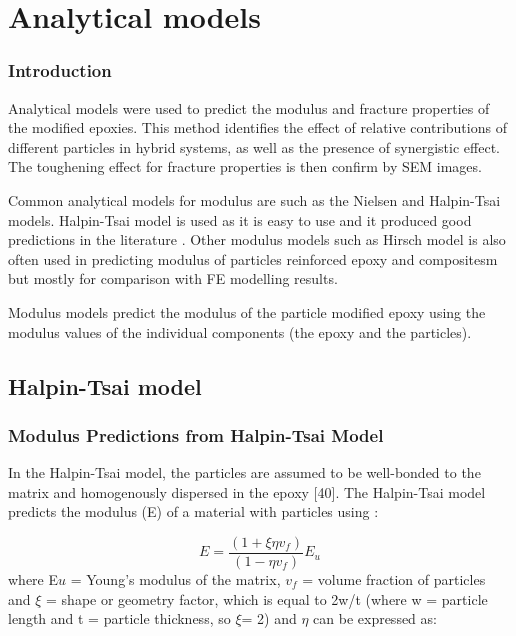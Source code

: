 \documentclass[numbers=noendperiod,chapterprefix=on]{icldt} %
\begin{document}
\chapter{Analytical models}

\subsection{Introduction}
Analytical models were used to predict the modulus and fracture properties of the modified epoxies.
This method identifies the effect of relative contributions of different particles in hybrid systems, as well as the presence of synergistic effect. The toughening effect for fracture properties is then confirm by SEM images.

Common analytical models for modulus are such as the Nielsen and Halpin-Tsai \cite{Hsieh2010a} models. Halpin-Tsai model is used as it is easy to use and it produced good predictions in the literature \cite{Giannakopoulos2011}. Other modulus models such as Hirsch model is also often used in predicting modulus of particles reinforced epoxy and compositesm but mostly for comparison with FE modelling results.

Modulus models predict the modulus of the particle modified epoxy using the modulus values of the individual components (the epoxy and the particles).

\section{Halpin-Tsai model}

\subsection{Modulus Predictions from Halpin-Tsai Model}
In the Halpin-Tsai model, the particles are assumed to be well-bonded to the matrix and homogenously dispersed in the epoxy [40]. The Halpin-Tsai model predicts the modulus (E) of a material with particles using \cite{Hsieh2010a,Hsieh2010,Giannakopoulos2011}:

\begin{equation} 
E=\frac{(1+\xi \eta v_f)}{(1-\eta v_f )} E_u
\end{equation}
where E$ u $ = Young's modulus of the matrix, $ v_{f} $ = volume fraction of particles and $ \xi $ = shape or geometry factor, which is equal to 2w/t (where w = particle length and t = particle thickness, so $ \xi $= 2) and $ \eta $ can be expressed as:
\end{document}
